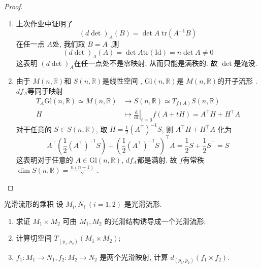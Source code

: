 \documentclass[../main.tex]{subfiles}
\begin{document}
\begin{proof}
    \begin{enumerate}
        \item [a).]上次作业中证明了 \[
      \left( d \det \right)_{A}\left( B \right)= \det A   \;\mathrm{tr}\left( A^{-1} B \right)   
      \]  在任一点 \(  A  \)处, 我们取 \(  B= A  \) ,则 \[
      \left( d \det  \right)_{A}\left( A \right)= \det A \mathrm{tr}\left( \mathrm{Id} \right)= n \det A\neq 0   
      \]这表明 \(  \left( d \det  \right)_{A}   \)在任一点处不是零映射, 从而只能是满秩的. 故 \(  \det   \)是淹没.
      \item [b).]   由于 \( M\left( n,\mathbb{R}  \right)   \)和 \(  S\left( n,\mathbb{R}  \right)   \)是线性空间 , \(  \mathrm{Gl}\left( n,\mathbb{R}  \right)   \)是 \(  M\left( n,\mathbb{R}  \right)   \)的开子流形   . \(  df_{A}  \)等同于映射 \[
      \begin{aligned}
      T_{A}\mathrm{Gl}\left( n,\mathbb{R}  \right)\simeq M\left( n,\mathbb{R}  \right)&\to    S\left( n,\mathbb{R}  \right)\simeq T_{f\left( A \right) }S\left( n,\mathbb{R}  \right)\\ 
       H&\mapsto \left. \frac{\mathrm{d}}{\mathrm{d}t} \right|_{t= 0}f\left( A+ tH \right)   = A^{\top}H+ H^{\top}A
      \end{aligned}
      \]  对于任意的 \(  S\in S\left( n,\mathbb{R}  \right)   \), 取 \(  H=\frac{1}{2} \left( A^{\top} \right)^{-1} S   \), 则 \(  A^{\top}H+ H^{\top}A  \)  化为\[
      A^{\top}\left(  \frac{1}{2}\left( A^{\top} \right)^{-1} S \right) +\left(\frac{1}{2} \left( A^{\top} \right)^{-1} S  \right)^{\top}A  =\frac{1}{2}S+\frac{1}{2} S^{\top}= S
      \]  这表明对于任意的 \(  A \in \mathrm{Gl}\left( n,\mathbb{R}  \right)   \), \(  df_{A}  \)都是满射. 故 \(  f  \)有常秩 \(  \operatorname{dim}S\left( n,\mathbb{R}  \right)= \frac{n\left( n+ 1 \right)  }{2 }    \)   . 
    \end{enumerate}
    
\end{proof}
\begin{exercise}{光滑流形的乘积}{}
设 $M_i, N_i \ (i=1,2)$ 是光滑流形.
\begin{enumerate}
    \item[a).] 求证 $M_1 \times M_2$ 可由 $M_1, M_2$ 的光滑结构诱导成一个光滑流形;
    \item[b).] 计算切空间 $T_{(p_1, p_2)}(M_1 \times M_2)$;
    \item[c).] $f_1: M_1 \to N_1, f_2: M_2 \to N_2$ 是两个光滑映射, 计算 $d_{(p_1, p_2)}(f_1 \times f_2)$.
\end{enumerate}
\end{exercise}
\end{document}
